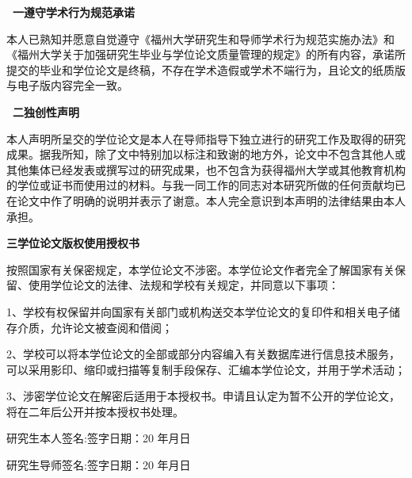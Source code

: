 \pagestyle{empty}{\fancyhf{}}
\fontsize{12pt}{20pt}\selectfont %

\begin{center}\fontsize{12pt}{20pt}\selectfont
	{\fontsize{14pt}{20pt}\bfseries\heitib \ 一\quad 遵守学术行为规范承诺 }
\end{center}

本人已熟知并愿意自觉遵守《福州大学研究生和导师学术行为规范实施办法》和《福州大学关于加强研究生毕业与学位论文质量管理的规定》的所有内容，承诺所提交的毕业和学位论文是终稿，不存在学术造假或学术不端行为，且论文的纸质版与电子版内容完全一致。

\vspace{0.8cm}

\begin{center}\fontsize{12pt}{20pt}\selectfont
	{\fontsize{14pt}{20pt} \bfseries\heitib \ 二\quad 独创性声明 }
\end{center}

本人声明所呈交的学位论文是本人在导师指导下独立进行的研究工作及取得的研究成果。据我所知，除了文中特别加以标注和致谢的地方外，论文中不包含其他人或其他集体已经发表或撰写过的研究成果，也不包含为获得福州大学或其他教育机构的学位或证书而使用过的材料。与我一同工作的同志对本研究所做的任何贡献均已在论文中作了明确的说明并表示了谢意。本人完全意识到本声明的法律结果由本人承担。

\vspace{0.8cm}

\begin{center}\fontsize{12pt}{20pt}\selectfont
	{\fontsize{14pt}{20pt} \bfseries\heitib 三\quad 学位论文版权使用授权书 }
\end{center}

按照国家有关保密规定，本学位论文不涉密。本学位论文作者完全了解国家有关保留、使用学位论文的法律、法规和学校有关规定，并同意以下事项：

1、学校有权保留并向国家有关部门或机构送交本学位论文的复印件和相关电子储存介质，允许论文被查阅和借阅；

2、学校可以将本学位论文的全部或部分内容编入有关数据库进行信息技术服务，可以采用影印、缩印或扫描等复制手段保存、汇编本学位论文，并用于学术活动；

3、涉密学位论文在解密后适用于本授权书。申请且认定为暂不公开的学位论文，将在二年后公开并按本授权书处理。

\vspace{0.6cm} 

\noindent \hei 研究生本人签名:\hrulefill\hspace{0.8em}\hspace{1.5em}签字日期：20 \quad 年\quad \quad 月\quad \quad 日 

\vspace{0.5cm} 

\noindent 研究生导师签名:\hrulefill\hspace{0.8em}\hspace{1.5em}签字日期：20 \quad 年\quad \quad 月\quad \quad 日 

\newpage

